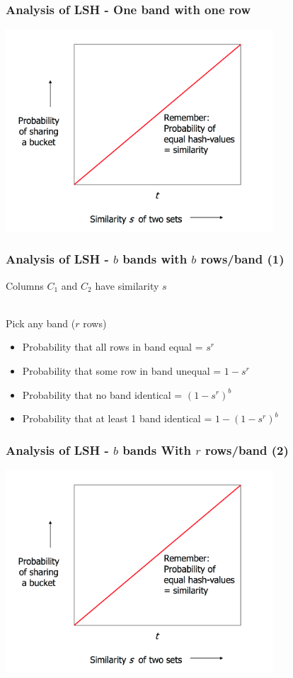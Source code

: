 \documentclass[svgnames]{beamer}
\begin{document}
  
\begin{frame} \frametitle{Analysis of LSH - One band with one row}
\includegraphics[width=10cm]{what-1-band-gives}
\end{frame}

  
\begin{frame} \frametitle{Analysis of LSH - $b$ bands with $b$ rows/band (1)}

Columns $C_1$ and $C_2$ have similarity $s$

~\\

Pick any band ($r$ rows)

\begin{itemize}
  \item Probability that all rows in band equal = $s^r$
  \item Probability that some row in band unequal = $1 - s^r$
  \item Probability that no band identical = $(1 - s^r)^b$
  \item Probability that at least 1 band identical = $1 - (1 - s^r)^b$  
\end{itemize}
\end{frame}

  
\begin{frame} \frametitle{Analysis of LSH - $b$ bands With $r$ rows/band (2)}
\includegraphics[width=10cm]{what-1-band-gives}
\end{frame}
\end{document}
